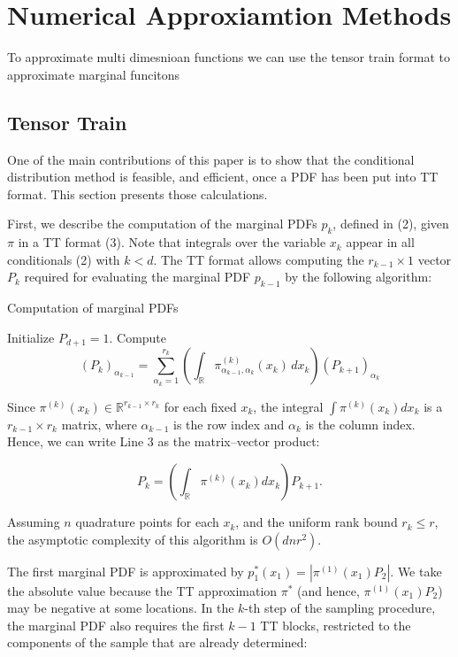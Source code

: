 \section{Numerical Approxiamtion Methods}
To approximate multi dimesnioan functions we can use the tensor train format to approximate marginal funcitons



\subsection{Tensor Train}

One of the main contributions of this paper is to show that the conditional distribution method is feasible, and efficient, once a PDF has been put into TT format. This section presents those calculations.

First, we describe the computation of the marginal PDFs \( p_k \), defined in (2), given \( \pi \) in a TT format (3). Note that integrals over the variable \( x_k \) appear in all conditionals (2) with \( k < d \). The TT format allows computing the \( r_{k-1} \times 1 \) vector \( P_k \) required for evaluating the marginal PDF \( p_{k-1} \) by the following algorithm:

\begin{algorithm}
	\caption{Computation of marginal PDFs}
	\begin{algorithmic}[1]
		\STATE Initialize \( P_{d+1} = 1 \).
		\STATE Compute
		\[
		(P_k)_{\alpha_{k-1}} =
		\sum_{\alpha_k=1}^{r_k} \left( \int_{\mathbb{R}} \pi^{(k)}_{\alpha_{k-1},\alpha_k} (x_k) \, dx_k \right) (P_{k+1})_{\alpha_k}
		\]
		\ENDFOR
	\end{algorithmic}
\end{algorithm}

Since \( \pi^{(k)}(x_k) \in \mathbb{R}^{r_{k-1} \times r_k} \) for each fixed \( x_k \), the integral \( \int \pi^{(k)}(x_k)dx_k \) is a \( r_{k-1} \times r_k \) matrix, where \( \alpha_{k-1} \) is the row index and \( \alpha_k \) is the column index. Hence, we can write Line 3 as the matrix–vector product:

\[
P_k = \left( \int_{\mathbb{R}} \pi^{(k)}(x_k)dx_k \right) P_{k+1}.
\]

Assuming \( n \) quadrature points for each \( x_k \), and the uniform rank bound \( r_k \leq r \), the asymptotic complexity of this algorithm is \( O(dnr^2) \).

The first marginal PDF is approximated by \( p^*_1(x_1) = |\pi^{(1)}(x_1) P_2| \). We take the absolute value because the TT approximation \( \pi^* \) (and hence, \( \pi^{(1)}(x_1) P_2 \)) may be negative at some locations. In the \( k \)-th step of the sampling procedure, the marginal PDF also requires the first \( k-1 \) TT blocks, restricted to the components of the sample that are already determined:

